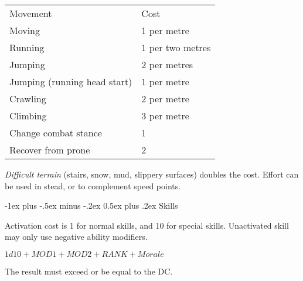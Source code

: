 \documentclass[8pt,landscape,a4paper]{article}
\makeatletter
\renewcommand{\section}{\@startsection{section}{1}{0mm}%
                                {-1ex plus -.5ex minus -.2ex}%
                                {0.5ex plus .2ex}%
                                {\normalfont\large\bfseries}}
\makeatother
\begin{document}
\begin{multicols}{4}
\begin{center}
\begin{tabular}{ll}
Movement                     & Cost             \\
Moving                       & 1 per metre      \\
Running                      & 1 per two metres \\
Jumping                      & 2 per metres     \\
Jumping (running head start) & 1 per metre      \\
Crawling                     & 2 per metre      \\
Climbing                     & 3 per metre      \\
Change combat stance         & 1                \\
Recover from prone           & 2
\end{tabular}
\end{center}

\emph{Difficult terrain} (stairs, snow, mud, slippery surfaces) doubles the
cost. Effort can be used in stead, or to complement speed points.

\section{Skills}

Activation cost is 1 for normal skills, and 10 for special skills.
Unactivated skill may only use negative ability modifiers.

\( 1d10 + MOD1 + MOD2 + RANK + Morale \)

The result must exceed or be equal to the DC.


\end{multicols}
\end{document}
